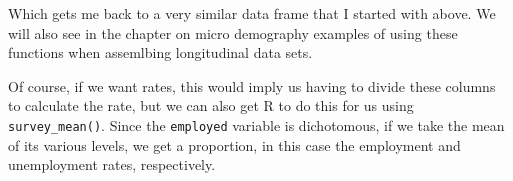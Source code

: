 \documentclass[
  letterpaper,
  DIV=11,
  numbers=noendperiod]{scrreprt}
\newenvironment{Shaded}{\begin{snugshade}}{\end{snugshade}}
\newcommand{\AttributeTok}[1]{\textcolor[rgb]{0.40,0.45,0.13}{#1}}
\newcommand{\DecValTok}[1]{\textcolor[rgb]{0.68,0.00,0.00}{#1}}
\newcommand{\FunctionTok}[1]{\textcolor[rgb]{0.28,0.35,0.67}{#1}}
\newcommand{\NormalTok}[1]{\textcolor[rgb]{0.00,0.23,0.31}{#1}}
\newcommand{\SpecialCharTok}[1]{\textcolor[rgb]{0.37,0.37,0.37}{#1}}
\newcommand{\StringTok}[1]{\textcolor[rgb]{0.13,0.47,0.30}{#1}}
\begin{document}
Which gets me back to a very similar data frame that I started with
above. We will also see in the chapter on micro demography examples of
using these functions when assemlbing longitudinal data sets.

Of course, if we want rates, this would imply us having to divide these
columns to calculate the rate, but we can also get R to do this for us
using \texttt{survey\_mean()}. Since the \texttt{employed} variable is
dichotomous, if we take the mean of its various levels, we get a
proportion, in this case the employment and unemployment rates,
respectively.

\begin{Shaded}
\end{Shaded}
\end{document}
